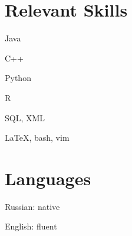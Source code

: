 \section{Relevant Skills}
\begin{innerlist}
  \item Java
  \item C++
  \item Python
  \item R
  \item SQL, XML
  \item \LaTeX, bash, vim
\end{innerlist}

\section{Languages}
\begin{innerlist}
  \item Russian: native 
  \item English: fluent
\end{innerlist}
